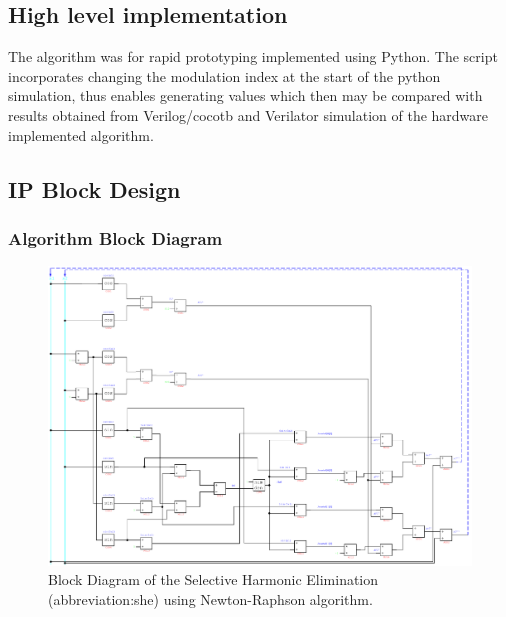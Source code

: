 \documentclass[a4paper, twoside, 11pt]{article}
\begin{document}
    \subsection{High level implementation}
    The algorithm was for rapid prototyping implemented using Python. The script incorporates changing the modulation index at the start of the python simulation, thus enables generating values which then may be compared with results obtained from Verilog/cocotb and Verilator simulation of the hardware implemented algorithm.
    \subsection{IP Block Design}

        \subsubsection{Algorithm Block Diagram}
            \begin{figure}[htbp!]
                \centering
                \includegraphics[width=1\textwidth]{src/pdf/she-overview.pdf}
                \caption{Block Diagram of the Selective Harmonic Elimination (\gls{abbreviation:she}) using Newton-Raphson algorithm.}
                \label{fig:she-overview}
            \end{figure}
\end{document}
